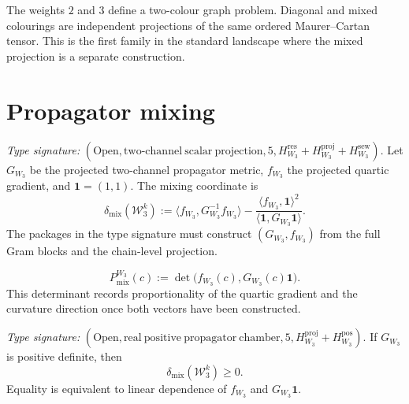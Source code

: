\begin{remark}
\label{rem:w3hol-uniform-weight-cross-channel}
The weights \(2\) and \(3\) define a two-colour graph problem.
Diagonal and mixed colourings are independent projections of the
same ordered Maurer--Cartan tensor.  This is the first family in the
standard landscape where the mixed projection is a separate
construction.
\end{remark}

\section{Propagator mixing}
\label{sec:w3hol-propagator-variance}

\begin{theorem}
\label{thm:w3hol-propagator-variance}
\emph{Type signature:}
\((\mathrm{Open},\mathrm{two\text{-}channel\ scalar\ projection},5,
H_{W_3}^{\mathrm{res}}+
H_{W_3}^{\mathrm{proj}}+
H_{W_3}^{\mathrm{sew}})\).
Let \(G_{W_3}\) be the projected two-channel propagator metric,
\(f_{W_3}\) the projected quartic gradient, and
\(\mathbf 1=(1,1)\).  The mixing coordinate is
\begin{equation}\label{eq:w3hol-prop-variance}
\delta_{\mathrm{mix}}(\mathcal W_3^k)
:=
\langle f_{W_3},G_{W_3}^{-1}f_{W_3}\rangle
-
\frac{\langle f_{W_3},\mathbf1\rangle^2}
{\langle\mathbf1,G_{W_3}\mathbf1\rangle}.
\end{equation}
The packages in the type signature must construct
\((G_{W_3},f_{W_3})\) from the full Gram blocks and the chain-level
projection.
\end{theorem}

\begin{equation}\label{eq:w3hol-mixing-poly}
P_{\mathrm{mix}}^{W_3}(c)
:=
\det\!\bigl(f_{W_3}(c),G_{W_3}(c)\mathbf1\bigr).
\end{equation}
This determinant records proportionality of the quartic gradient and
the curvature direction once both vectors have been constructed.

\begin{corollary}
\label{cor:w3hol-prop-variance-positive}
\emph{Type signature:}
\((\mathrm{Open},\mathrm{real\ positive\ propagator\ chamber},5,
H_{W_3}^{\mathrm{proj}}+H_{W_3}^{\mathrm{pos}})\).
If \(G_{W_3}\) is positive definite, then
\[
\delta_{\mathrm{mix}}(\mathcal W_3^k)\geq0.
\]
Equality is equivalent to linear dependence of
\(f_{W_3}\) and \(G_{W_3}\mathbf1\).
\end{corollary}

